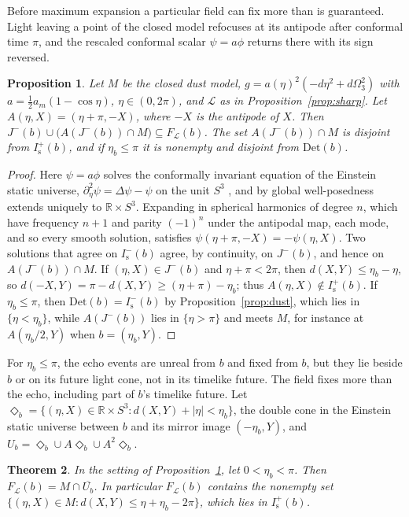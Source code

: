 \documentclass[11pt]{article}
\newtheorem{theorem}{Theorem}
\newtheorem{proposition}[theorem]{Proposition}
\theoremstyle{definition}
\newcommand{\Is}{I^-_{\mathrm s}}
\newcommand{\Isp}{I^+_{\mathrm s}}
\newcommand{\Det}{\mathrm{Det}}
\begin{document}
Before maximum expansion a particular field can fix more than is guaranteed.
Light leaving a point of the closed model refocuses at its antipode after
conformal time $\pi$, and the rescaled conformal scalar $\psi=a\phi$ returns
there with its sign reversed.

\begin{proposition}\label{prop:echo}
Let $M$ be the closed dust model, $g=a(\eta)^2(-d\eta^2+d\Omega_3^2)$ with
$a=\tfrac12a_m(1-\cos\eta)$, $\eta\in(0,2\pi)$, and $\mathcal L$ as in
Proposition~\ref{prop:sharp}. Let $A(\eta,X)=(\eta+\pi,-X)$, where $-X$ is the
antipode of $X$. Then $J^-(b)\cup\bigl(A(J^-(b))\cap M\bigr)\subseteq
F_{\mathcal L}(b)$. The set $A(J^-(b))\cap M$ is disjoint from $\Isp(b)$, and if
$\eta_b\le\pi$ it is nonempty and disjoint from $\Det(b)$.
\end{proposition}

\begin{proof}
Here $\psi=a\phi$ solves the conformally invariant equation of the Einstein
static universe, $\partial_\eta^2\psi=\Delta\psi-\psi$ on the unit $S^3$
\citep[app.~D]{Wald1984}, and by global well-posedness extends uniquely to
$\mathbb R\times S^3$.
Expanding in spherical harmonics of degree $n$, which have frequency $n+1$
and parity $(-1)^n$ under the antipodal map, each mode, and so every smooth
solution, satisfies $\psi(\eta+\pi,-X)=-\psi(\eta,X)$. Two solutions that agree on $\Is(b)$ agree, by continuity, on $J^-(b)$, and
hence on $A(J^-(b))\cap M$. If $(\eta,X)\in J^-(b)$ and $\eta+\pi<2\pi$, then
$d(X,Y)\le\eta_b-\eta$, so $d(-X,Y)=\pi-d(X,Y)\ge(\eta+\pi)-\eta_b$;
thus $A(\eta,X)\notin\Isp(b)$. If $\eta_b\le\pi$, then
$\Det(b)=\Is(b)$ by Proposition~\ref{prop:dust}, which lies in
$\{\eta<\eta_b\}$, while $A(J^-(b))$ lies in $\{\eta>\pi\}$ and meets $M$, for
instance at $A(\eta_b/2,Y)$ when $b=(\eta_b,Y)$.
\end{proof}

For $\eta_b\le\pi$, the echo events are unreal from $b$ and fixed from $b$,
but they lie beside $b$ or on its future light cone, not in its timelike
future. The field fixes
more than the echo, including part of $b$'s timelike future. Let
$\Diamond_b=\{(\eta,X)\in\mathbb R\times S^3:d(X,Y)+|\eta|<\eta_b\}$, the double
cone in the Einstein static universe between $b$ and its mirror image
$(-\eta_b,Y)$, and $U_b=\Diamond_b\cup A\Diamond_b\cup A^2\Diamond_b$.

\begin{theorem}\label{thm:diamonds}
In the setting of Proposition~\ref{prop:echo}, let $0<\eta_b<\pi$. Then
$F_{\mathcal L}(b)=M\cap\overline{U_b}$. In
particular $F_{\mathcal L}(b)$ contains the nonempty set
$\{(\eta,X)\in M:d(X,Y)\le\eta+\eta_b-2\pi\}$, which lies in $\Isp(b)$.
\end{theorem}
\end{document}
